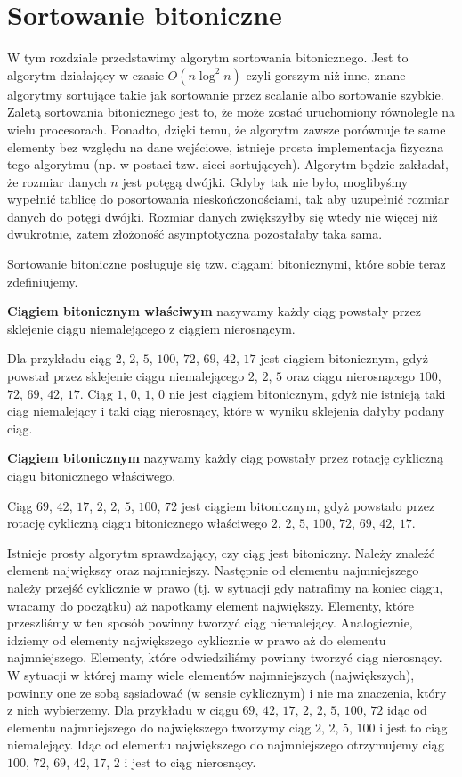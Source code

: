\section{Sortowanie bitoniczne}

W tym rozdziale przedstawimy algorytm sortowania bitonicznego.
Jest to algorytm działający w czasie $O(n \log^2 n)$ czyli gorszym niż inne, znane algorytmy sortujące takie jak sortowanie przez scalanie albo sortowanie szybkie.
Zaletą sortowania bitonicznego jest to, że może zostać uruchomiony równolegle na wielu procesorach.
Ponadto, dzięki temu, że algorytm zawsze porównuje te same elementy bez względu na dane wejściowe, istnieje prosta implementacja fizyczna tego algorytmu (np. w postaci tzw. sieci sortujących).
Algorytm będzie zakładał, że rozmiar danych $n$ jest potęgą dwójki.
Gdyby tak nie było, moglibyśmy wypełnić tablicę do posortowania nieskończonościami, tak aby uzupełnić rozmiar danych do potęgi dwójki.
Rozmiar danych zwiększyłby się wtedy nie więcej niż dwukrotnie, zatem złożoność asymptotyczna pozostałaby taka sama.

Sortowanie bitoniczne posługuje się tzw. ciągami bitonicznymi, które sobie teraz zdefiniujemy.
\begin{definition}
 \textbf{Ciągiem bitonicznym właściwym} nazywamy każdy ciąg powstały przez sklejenie ciągu niemalejącego z ciągiem nierosnącym.
\end{definition}
Dla przykładu ciąg $2$, $2$, $5$, $100$, $72$, $69$, $42$, $17$ jest ciągiem bitonicznym, gdyż powstał przez sklejenie ciągu niemalejącego $2$, $2$, $5$ oraz ciągu nierosnącego $100$, $72$, $69$, $42$, $17$.
Ciąg $1$, $0$, $1$, $0$ nie jest ciągiem bitonicznym, gdyż nie istnieją taki ciąg niemalejący i taki ciąg nierosnący, które w wyniku sklejenia dałyby podany ciąg.
\begin{definition}
 \textbf{Ciągiem bitonicznym} nazywamy każdy ciąg powstały przez rotację cykliczną ciągu bitonicznego właściwego.
\end{definition}
Ciąg $69$, $42$, $17$, $2$, $2$, $5$, $100$, $72$ jest ciągiem bitonicznym, gdyż powstało przez rotację cykliczną ciągu bitonicznego właściwego $2$, $2$, $5$, $100$, $72$, $69$, $42$, $17$.

Istnieje prosty algorytm sprawdzający, czy ciąg jest bitoniczny.
Należy znaleźć element największy oraz najmniejszy.
Następnie od elementu najmniejszego należy przejść cyklicznie w prawo (tj. w sytuacji gdy natrafimy na koniec ciągu, wracamy do początku) aż napotkamy element największy.
Elementy, które przeszliśmy w ten sposób powinny tworzyć ciąg niemalejący.
Analogicznie, idziemy od elementy największego cyklicznie w prawo aż do elementu najmniejszego.
Elementy, które odwiedziliśmy powinny tworzyć ciąg nierosnący.
W sytuacji w której mamy wiele elementów najmniejszych (największych), powinny one ze sobą sąsiadować (w sensie cyklicznym) i nie ma znaczenia, który z nich wybierzemy.
Dla przykładu w ciągu  $69$, $42$, $17$, $2$, $2$, $5$, $100$, $72$ idąc od elementu najmniejszego do największego tworzymy ciąg $2$, $2$, $5$, $100$ i jest to ciąg niemalejący.
Idąc od elementu największego do najmniejszego otrzymujemy ciąg $100$, $72$, $69$, $42$, $17$, $2$ i jest to ciąg nierosnący.

